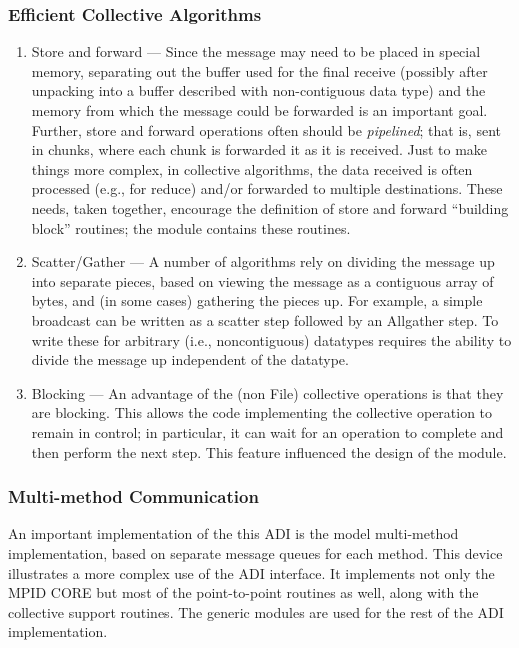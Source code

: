 \documentclass{article}
\begin{document}
\subsubsection{Efficient Collective Algorithms}
\begin{enumerate}
\item Store and forward --- Since the message may need to be placed in
special memory, separating out the buffer used for the final receive
(possibly after unpacking into a buffer described with non-contiguous
data type) and the memory from which the message could be forwarded is
an important goal.  Further, store and
forward operations often should be \emph{pipelined}; that is, sent in
chunks, where each chunk is forwarded it as it is received.
Just to make things more complex, in collective algorithms, the data
received is often processed (e.g., for reduce) and/or forwarded to
multiple destinations.  These needs, taken together, encourage the
definition of store and forward ``building block'' routines; the 
module contains these routines.

\item Scatter/Gather --- A number of algorithms rely on dividing the
message up into separate pieces, based on viewing the message as a
contiguous array of bytes, and (in some cases) gathering the pieces
up.  For example, a simple broadcast can be written as a scatter step
followed by an Allgather step.  To write these for arbitrary (i.e.,
noncontiguous) datatypes requires the ability to divide the message up
independent of the datatype.  

\item Blocking --- An advantage of the (non File) collective
operations is that they are blocking.  This allows the code
implementing the collective operation to remain in control; in
particular, it can wait for an operation to complete and then perform
the next step.  This feature influenced the design of the
 module.
\end{enumerate}

\subsubsection{Multi-method Communication}
An important implementation of the this ADI is the model multi-method
implementation, based on separate message queues for each method.
This device illustrates a more complex use of the ADI interface.  It
implements not only the MPID CORE but most of the point-to-point
routines as well, along with the collective support routines.  The
generic modules are used for the rest of the ADI implementation.
\end{document}
